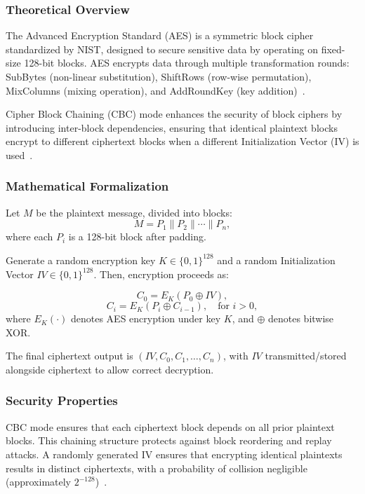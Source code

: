 \documentclass[12pt]{article}
\begin{document}
\subsubsection{Theoretical Overview}

The Advanced Encryption Standard (AES) is a symmetric block cipher standardized by NIST, designed to secure sensitive data by operating on fixed-size 128-bit blocks. AES encrypts data through multiple transformation rounds: SubBytes (non-linear substitution), ShiftRows (row-wise permutation), MixColumns (mixing operation), and AddRoundKey (key addition)~\cite{stallings2017}.

Cipher Block Chaining (CBC) mode enhances the security of block ciphers by introducing inter-block dependencies, ensuring that identical plaintext blocks encrypt to different ciphertext blocks when a different Initialization Vector (IV) is used~\cite{nist80038a}.

\subsubsection{Mathematical Formalization}

Let $M$ be the plaintext message, divided into blocks:
\[
M = P_1 \parallel P_2 \parallel \cdots \parallel P_n,
\]
where each $P_i$ is a 128-bit block after padding.

Generate a random encryption key $K \in \{0,1\}^{128}$ and a random Initialization Vector $IV \in \{0,1\}^{128}$. Then, encryption proceeds as:

\[
C_0 = E_K(P_0 \oplus IV),
\]
\[
C_i = E_K(P_i \oplus C_{i-1}), \quad \text{for } i > 0,
\]
where $E_K(\cdot)$ denotes AES encryption under key $K$, and $\oplus$ denotes bitwise XOR.

The final ciphertext output is $(IV, C_0, C_1, \dots, C_n)$, with $IV$ transmitted/stored alongside ciphertext to allow correct decryption.

\subsubsection{Security Properties}

CBC mode ensures that each ciphertext block depends on all prior plaintext blocks. This chaining structure protects against block reordering and replay attacks. A randomly generated IV ensures that encrypting identical plaintexts results in distinct ciphertexts, with a probability of collision negligible (approximately $2^{-128}$)~\cite{menezes1996}.
\end{document}
